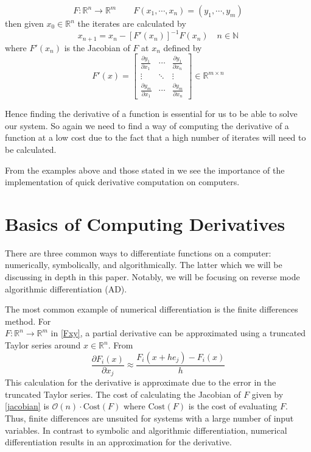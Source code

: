 \documentclass{article}
\begin{document}
\begin{equation} \label{Fxy}
        F: \mathbb{R}^n \rightarrow \mathbb{R}^m \qquad F(x_1, \cdots, x_n) = (y_1, \cdots, y_m)
\end{equation}
then given $x_0 \in \mathbb{R}^n$ the iterates are calculated by
\begin{equation}
x_{n+1} = x_n - [F'(x_n)]^{-1}F(x_n) \quad n \in \mathbb{N}
\end{equation}
where $F'(x_n)$ is the Jacobian of $F$ at $x_n$ defined by
\begin{equation} \label{jacobian}
    F'(x) = \begin{bmatrix}
        \frac{\partial y_1}{\partial x_1} & \cdots & \frac{\partial y_1}{\partial x_n} \\
        \vdots & \ddots & \vdots \\
        \frac{\partial y_m}{\partial x_1} & \cdots & \frac{\partial y_m}{\partial x_n}
    \end{bmatrix} \in \mathbb{R}^{m \times n}
\end{equation}

Hence finding the derivative of a function is essential for us to be able to solve our system. So again we need to find a way of computing the derivative of a function at a low cost due to the fact that a high number of iterates will need to be calculated.

From the examples above and those stated in \cite{appad} we see the importance of the implementation of quick derivative computation on computers.

\section{Basics of Computing Derivatives}

There are three common ways to differentiate functions on a computer: numerically, symbolically, and algorithmically. The latter which we will be discussing in depth in this paper. Notably, we will be focusing on reverse mode algorithmic differentiation (AD).

The most common example of numerical differentiation is the finite differences method. For \\ $F: \mathbb{R}^n \longrightarrow \mathbb{R}^m$ in \eqref{Fxy}, a partial derivative can be approximated using a truncated Taylor series around $x \in \mathbb{R}^n$. From \cite{chem}
\begin{equation}
    \frac{\partial F_i (x)}{\partial x_j} \approx \frac{F_i(x+he_j) - F_i(x)}{h}
\end{equation}
This calculation for the derivative is approximate due to the error in the truncated Taylor series. The cost of calculating the Jacobian of $F$ given by \eqref{jacobian} is $\mathcal{O}(n)\cdot \mathrm{Cost}(F)$ where $\mathrm{Cost}(F)$ is the cost of evaluating $F$. Thus, finite differences are unsuited for systems with a large number of input variables. In contrast to symbolic and algorithmic differentiation, numerical differentiation results in an approximation for the derivative.
\end{document}
